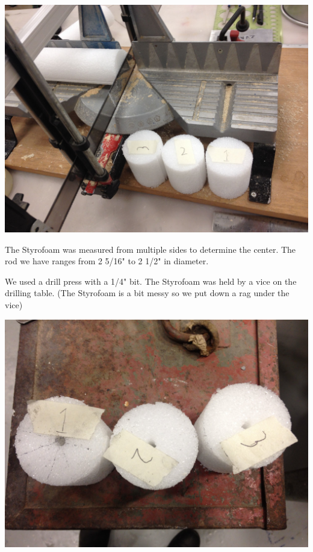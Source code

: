 \documentclass[11pt]{article} %
\begin{document}
\begin{center}
\includegraphics[scale=0.15]{feed/01.jpeg}
\end{center}

The Styrofoam was measured from multiple sides to determine the center. The rod we have ranges from 2 5/16" to 2 1/2" in diameter.

We used a drill press with a 1/4" bit. The Styrofoam was held by a vice on the drilling table. (The Styrofoam is a bit messy so we put down a rag under the vice) 

\begin{center}
\includegraphics[scale=0.09]{feed/02.jpeg}
\end{center}
\end{document}

